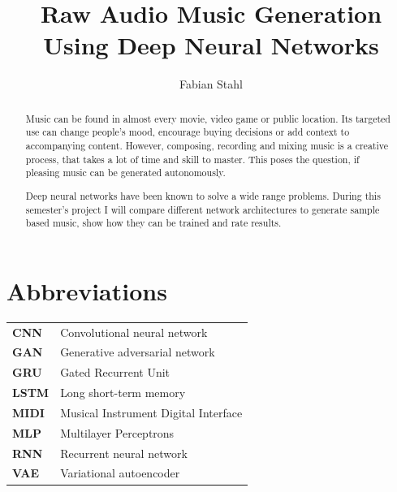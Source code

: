 \documentclass[12pt]{article}
\begin{document}
\setlength\parindent{0pt}
\title{Raw Audio Music Generation Using Deep Neural Networks}
\author{Fabian Stahl}


\maketitle

\tableofcontents

\newpage
\section*{Abbreviations}
\begin{center}
\begin{tabular}{l l}
\textbf{CNN} & Convolutional neural network \\
\textbf{GAN} & Generative adversarial network \\
\textbf{GRU} & Gated Recurrent Unit \\
\textbf{LSTM} & Long short-term memory \\
\textbf{MIDI} & Musical Instrument Digital Interface \\
\textbf{MLP} & Multilayer Perceptrons \\
\textbf{RNN} & Recurrent neural network \\
\textbf{VAE} & Variational autoencoder \\
\end{tabular}
\end{center}
\newpage


\begin{abstract}
Music can be found in almost every movie, video game or public location.
Its targeted use can change people's mood, encourage buying decisions or add context to accompanying content.
However, composing, recording and mixing music is a creative process, that takes a lot of time and skill to master.
This poses the question, if pleasing music can be generated autonomously.

Deep neural networks have been known to solve a wide range problems.
During this semester's project I will compare different network architectures to generate sample based music, show how they can be trained and rate results.
\end{abstract}
\end{document}
